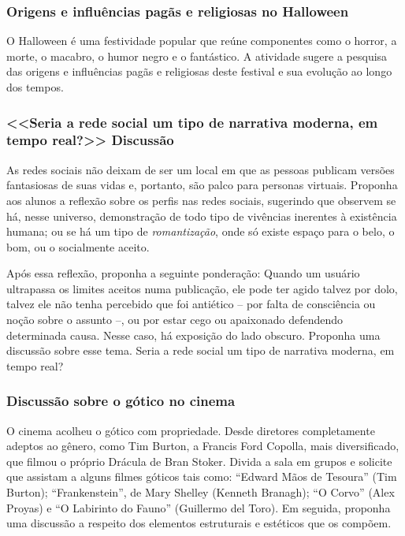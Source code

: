 \documentclass[12pt]{extarticle}
\begin{document}
\subsubsection{Origens e influências pagãs e religiosas no Halloween}

O Halloween é uma festividade popular que reúne componentes como o
horror, a morte, o macabro, o humor negro e o fantástico. A atividade
sugere a pesquisa das origens e influências pagãs e religiosas deste
festival e sua evolução ao longo dos tempos.

\subsubsection{<<Seria a rede social um tipo de narrativa
moderna, em tempo real?>> Discussão}


As redes sociais não deixam de ser um local em que as pessoas publicam
versões fantasiosas de suas vidas e, portanto, são palco para personas
virtuais. Proponha aos alunos a reflexão sobre os perfis nas redes
sociais, sugerindo que observem se há, nesse universo, demonstração de
todo tipo de vivências inerentes à existência humana; ou se há um tipo
de \emph{romantização}, onde só existe espaço para o belo, o bom, ou o
socialmente aceito. 

Após essa reflexão, proponha a seguinte
ponderação: Quando um usuário ultrapassa os limites aceitos numa
publicação, ele pode ter agido talvez por dolo, talvez ele não tenha
percebido que foi antiético -- por falta de consciência ou noção sobre
o assunto --, ou por estar cego ou apaixonado defendendo determinada
causa. Nesse caso, há exposição do lado obscuro. Proponha uma
discussão sobre esse tema. Seria a rede social um tipo de narrativa
moderna, em tempo real?


\subsubsection{Discussão sobre o gótico no cinema}

O cinema acolheu o gótico com propriedade. Desde diretores
completamente adeptos ao gênero, como Tim Burton, a Francis Ford
Copolla, mais diversificado, que filmou o próprio Drácula de Bran
Stoker. Divida a sala em grupos e solicite que assistam a alguns filmes góticos
tais como: ``Edward Mãos de Tesoura'' (Tim Burton); ``Frankenstein'', de Mary
Shelley (Kenneth Branagh); ``O Corvo'' (Alex Proyas) e ``O Labirinto do
Fauno'' (Guillermo del Toro). Em seguida, proponha uma discussão a
respeito dos elementos estruturais e estéticos que os compõem.
\end{document}
